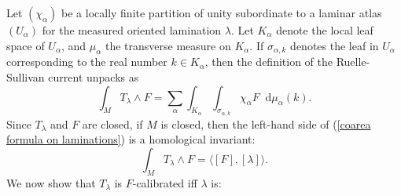 \documentclass[reqno,11pt]{amsart}
\newcommand*\dif{\mathop{}\!\mathrm{d}}
\theoremstyle{definition}
\numberwithin{equation}{section}
\begin{document}
Let $(\chi_\alpha)$ be a locally finite partition of unity subordinate to a laminar atlas $(U_\alpha)$ for the measured oriented lamination $\lambda$.
Let $K_\alpha$ denote the local leaf space of $U_\alpha$, and $\mu_\alpha$ the transverse measure on $K_\alpha$.
If $\sigma_{\alpha, k}$ denotes the leaf in $U_\alpha$ corresponding to the real number $k \in K_\alpha$, then the definition of the Ruelle-Sullivan current unpacks as
\begin{equation}\label{coarea formula on laminations}
\int_M T_\lambda \wedge F = \sum_\alpha \int_{K_\alpha} \int_{\sigma_{\alpha, k}} \chi_\alpha F \dif \mu_\alpha(k).
\end{equation}
Since $T_\lambda$ and $F$ are closed, if $M$ is closed, then the left-hand side of (\ref{coarea formula on laminations}) is a homological invariant:
\begin{equation}\label{Ruelle Sullivan homology}
\int_M T_\lambda \wedge F = \langle [F], [\lambda]\rangle.
\end{equation}
We now show that $T_\lambda$ is $F$-calibrated iff $\lambda$ is:
\end{document}
